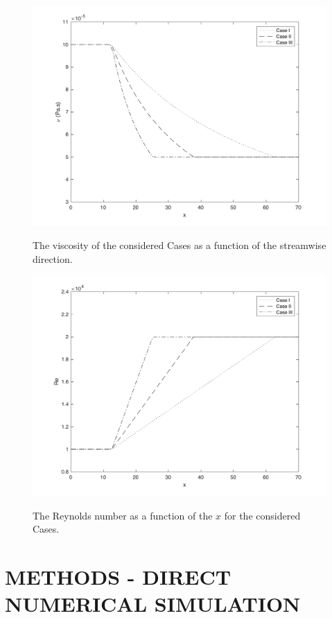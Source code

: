 \documentclass[twocolumn,10pt]{asme2e}
\begin{document}
\begin{figure}[t]
	\centering
	\scalebox{0.5}
	{\includegraphics{viscosity.pdf}}
	\caption{The viscosity of the considered Cases as a function of the streamwise direction.}
	\label{fig:viscosity}
	\end{figure}

\begin{figure}[t]
	\centering
	\scalebox{0.5}
	{\includegraphics{reynolds.pdf}}
	\caption{The Reynolds number as a function of the \(x\) for the considered Cases.}
	\label{fig:reynolds}
\end{figure}

\section*{METHODS - DIRECT NUMERICAL SIMULATION}
\end{document}
